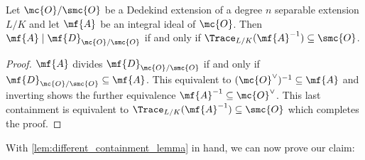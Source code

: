     \begin{lemma}\label{lem:different_containment_lemma}
      Let \(\mc{O}/\smc{O}\) be a Dedekind extension of a degree \(n\) separable extension \(L/K\) and let \(\mf{A}\) be an integral ideal of \(\mc{O}\). Then \(\mf{A} \mid \mf{D}_{\mc{O}/\smc{O}}\) if and only if \(\Trace_{L/K}(\mf{A}^{-1}) \subseteq \smc{O}\).
    \end{lemma}
    \begin{proof}
      \(\mf{A}\) divides \(\mf{D}_{\mc{O}/\smc{O}}\) if and only if \(\mf{D}_{\mc{O}/\smc{O}} \subseteq \mf{A}\). This equivalent to \((\mc{O}^{\vee})^{-1} \subseteq \mf{A}\) and inverting shows the further equivalence \(\mf{A}^{-1} \subseteq \mc{O}^{\vee}\). This last containment is equivalent to \(\Trace_{L/K}(\mf{A}^{-1}) \subseteq \smc{O}\) which completes the proof.
    \end{proof}

    With \cref{lem:different_containment_lemma} in hand, we can now prove our claim:

